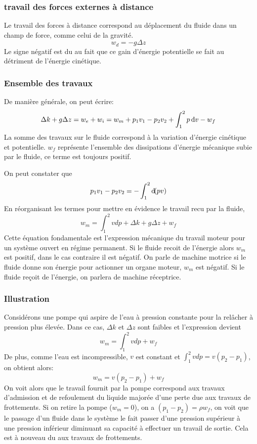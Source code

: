 \subsubsection{travail des forces externes à distance}
Le travail des forces à distance correspond au déplacement du fluide
dans un champ de force, comme celui de la gravité.
\[  w_d = -g \Delta z \]
Le signe négatif est du au fait que ce gain d'énergie potentielle
se fait au détriment de l'énergie cinétique.

\subsubsection{Ensemble des travaux}
De manière générale, on peut écrire:
\[  \Delta k + g\Delta z = w_e + w_i =
w_m+p_1v_1-p_2v_2+\int_1^2 p \operatorname{d}\! v -w_f \]
La somme des travaux sur le fluide correspond
à la variation d'énergie cinétique et potentielle.
$w_f$ représente l'ensemble des dissipations
d'énergie mécanique subie par le fluide, ce terme est toujours positif.

On peut constater que
\[  p_1v_1-p_2v_2 = -\int_1^2 \operatorname{d}\!(pv) \]
En réorganisant les termes pour mettre en évidence
le travail recu par la fluide,
\[ w_m = \int_1^2vdp+\Delta k +g\Delta z +w_f \]
Cette équation fondamentale est l'expression mécanique
du travail moteur pour un système ouvert en régime permanent.
Si le fluide recoit de l'énergie alors $w_m$ est positif,
dans le cas contraire il est négatif.
On parle de machine motrice si le fluide donne son énergie
pour actionner un organe moteur, $w_m$ est négatif.
Si le fluide reçoit de l'énergie, on parlera de machine réceptrice.

\subsubsection{Illustration}
Considérons une pompe qui aspire de l'eau à pression constante
pour la relâcher à pression plus élevée.
Dans ce cas, $\Delta k$ et $\Delta z$ sont faibles et l'expression devient
\[ w_m = \int_1^2vdp +w_f \]
De plus, comme l'eau est incompressible,
$v$ est constant et $\int_1^2 vdp = v(p_2 - p_1)$, on obtient alors:
\[ w_m = v(p_2-p_1)+w_f \]
On voit alors que le travail fournit par la pompe correspond
aux travaux d'admission et de refoulement du
liquide majorée d'une perte due aux travaux de frottements.
Si on retire la pompe ($w_m = 0$), on a $(p_1-p_2) = \rho w_f$,
on voit que le passage d'un fluide dans le système le fait passer
d'une pression supérieur à une pression inférieur diminuant
sa capacité à effectuer un travail de sortie.
Cela est à nouveau du aux travaux de frottements.

